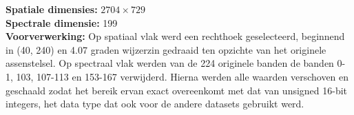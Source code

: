 \textbf{Spatiale dimensies:} $2704 \times 729$\\
\textbf{Spectrale dimensie:} 199\\
\textbf{Voorverwerking:} Op spatiaal vlak werd een rechthoek geselecteerd, beginnend in (40, 240) en 4.07 graden wijzerzin gedraaid ten opzichte van het originele assenstelsel. Op spectraal vlak werden van de 224 originele banden de banden 0-1, 103, 107-113 en 153-167 verwijderd. Hierna werden alle waarden verschoven en geschaald zodat het bereik ervan exact overeenkomt met dat van unsigned 16-bit integers, het data type dat ook voor de andere datasets gebruikt werd.